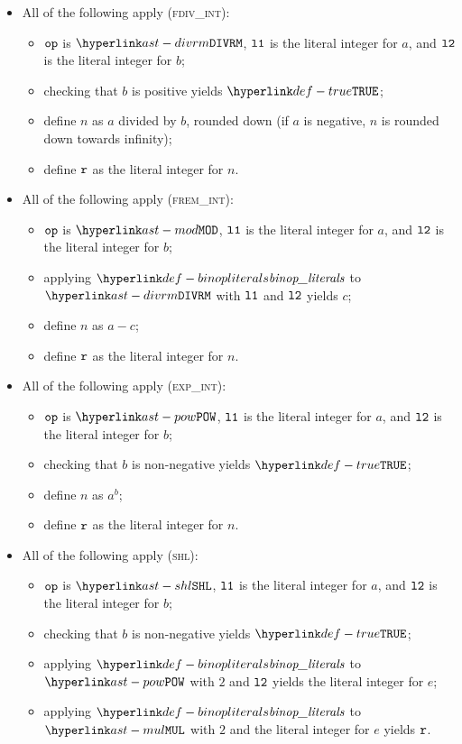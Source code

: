 \begin{itemize}
  \item All of the following apply (\textsc{fdiv\_int}):
  \begin{itemize}
    \item $\texttt{op}$ is $\DIVRM$, $\texttt{l1}$ is the literal integer for $a$, and $\texttt{l2}$ is the literal integer for $b$;
    \item checking that $b$ is positive yields $\True$\ProseOrTypeError;
    \item define $n$ as $a$ divided by $b$, rounded down (if $a$ is negative, $n$ is rounded down towards infinity);
    \item define $\texttt{r}$ as the literal integer for $n$.
  \end{itemize}

  \item All of the following apply (\textsc{frem\_int}):
  \begin{itemize}
    \item $\texttt{op}$ is $\MOD$, $\texttt{l1}$ is the literal integer for $a$, and $\texttt{l2}$ is the literal integer for $b$;
    \item applying $\binopliterals$ to $\DIVRM$ with $\texttt{l1}$ and $\texttt{l2}$ yields $c$\ProseOrTypeError;
    \item define $n$ as $a-c$;
    \item define $\texttt{r}$ as the literal integer for $n$.
  \end{itemize}

  \item All of the following apply (\textsc{exp\_int}):
  \begin{itemize}
    \item $\texttt{op}$ is $\POW$, $\texttt{l1}$ is the literal integer for $a$, and $\texttt{l2}$ is the literal integer for $b$;
    \item checking that $b$ is non-negative yields $\True$\ProseOrTypeError;
    \item define $n$ as $a^b$;
    \item define $\texttt{r}$ as the literal integer for $n$.
  \end{itemize}

  \item All of the following apply (\textsc{shl}):
  \begin{itemize}
    \item $\texttt{op}$ is $\SHL$, $\texttt{l1}$ is the literal integer for $a$, and $\texttt{l2}$ is the literal integer for $b$;
    \item checking that $b$ is non-negative yields $\True$\ProseOrTypeError;
    \item applying $\binopliterals$ to $\POW$ with $2$ and $\texttt{l2}$ yields the literal integer for $e$;
    \item applying $\binopliterals$ to $\MUL$ with $2$ and the literal integer for $e$ yields $\texttt{r}$.
  \end{itemize}


\end{itemize}
